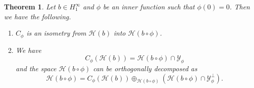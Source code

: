 \documentclass[11pt]{amsart}
\def\HH{{\mathcal H}}
\def\YY{{\mathcal Y}}
\numberwithin{equation}{section}
\theoremstyle{plain}
\newtheorem{theorem}[equation]{Theorem}
\theoremstyle{definition}
\begin{document}
\begin{theorem}\label{th:compo inner}
	Let $b \in H^{\infty}_{1}$ and $\phi$ be an inner function such that $\phi(0) = 0$. Then we have the following. 
\begin{enumerate}
    \item  $C_\phi$ is an isometry from $\mathcal{H}(b)$ into $\mathcal{H}(b \circ \phi)$.
    \item We have 
    $$C_\phi(\HH(b))=\HH(b\circ\phi)\cap\YY_\phi$$ and the space $\HH(b\circ\phi)$ can be orthogonally decomposed as
		\begin{equation}\label{eq:decomp H(b circ phi)}
			\HH(b\circ\phi)= C_\phi(\HH(b))\oplus_{	\HH(b\circ\phi)} 	\left(\HH(b\circ\phi)\cap\YY_\phi^\perp\right).
		\end{equation}
\end{enumerate}		 
\end{theorem}
\end{document}
